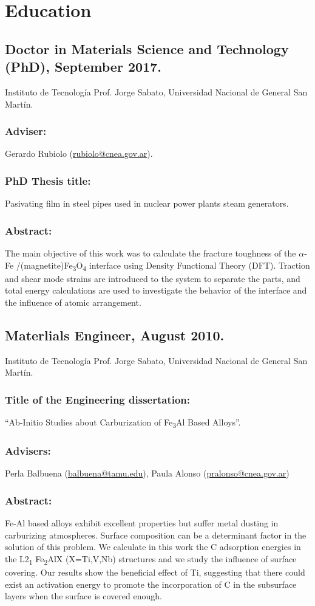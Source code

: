 \section{Education}

\subsection{Doctor in Materials Science and Technology (PhD), September 2017.} Instituto de
Tecnología Prof. Jorge Sabato, Universidad Nacional de General San Martín. \subsubsection{Adviser:}
Gerardo Rubiolo (\url{rubiolo@cnea.gov.ar}).
\subsubsection{PhD Thesis title:} Pasivating film in steel pipes used in nuclear power plants steam
generators.
\subsubsection{Abstract:} The main objective of this work was to calculate the fracture toughness of the 
$\alpha$-Fe /(magnetite)Fe\textsubscript{3}O\textsubscript{4} interface using Density Functional 
Theory (DFT). Traction and shear mode strains are introduced to the system to 
separate the parts, and total energy
calculations are used to investigate the behavior of the interface and the influence of
atomic arrangement.

\subsection{Materlials Engineer, August 2010.} Instituto de Tecnología Prof. Jorge Sabato,
Universidad Nacional de General San Martín.
\subsubsection{Title of the Engineering dissertation:} “Ab-Initio Studies about Carburization 
of Fe\textsubscript{3}Al Based Alloys”.
\subsubsection{Advisers:} Perla Balbuena (\url{balbuena@tamu.edu}), Paula Alonso (\url{pralonso@cnea.gov.ar})
\subsubsection{Abstract:} Fe-Al based alloys exhibit excellent properties but suffer metal dusting in
carburizing atmospheres. Surface composition can be a determinant factor in the solution
of this problem. We calculate in this work the C adsorption energies in the L2\textsubscript{1} Fe\textsubscript{2}AlX
(X=Ti,V,Nb) structures and we study the influence of surface covering. Our results show
the beneficial effect of Ti, suggesting that there could exist an activation energy to promote
the incorporation of C in the subsurface layers when the surface is covered enough.

